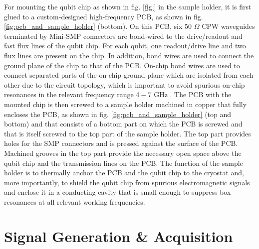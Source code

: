 For mounting the qubit chip as shown in fig. \ref{fig:} in the sample holder, it is first glued to a custom-designed high-frequency PCB, as shown in fig. \ref{fig:pcb_and_sample_holder} (bottom). On this PCB, six 50 $\Omega$ CPW waveguides terminated by Mini-SMP connectors are bond-wired to the drive/readout and fast flux lines of the qubit chip. For each qubit, one readout/drive line and two flux lines are present on the chip. In addition, bond wires are used to connect the ground plane of the chip to that of the PCB. On-chip bond wires are used to connect separated parts of the on-chip ground plane which are isolated from each other due to the circuit topology, which is important to avoid spurious on-chip resonances in the relevant frequency range $4-7$ GHz \citep{schuster_circuit_2007}. The PCB with the mounted chip is then screwed to a sample holder machined in copper that fully encloses the PCB, as shown in fig. \ref{fig:pcb_and_sample_holder} (top and bottom) and that consists of a bottom part on which the PCB is screwed and that is itself screwed to the top part of the sample holder. The top part provides holes for the SMP connectors and is pressed against the surface of the PCB. Machined grooves in the top part provide the necessary open space above the qubit chip and the transmission lines on the PCB. The function of the sample holder is to thermally anchor the PCB and the qubit chip to the cryostat and, more importantly, to shield the qubit chip from spurious electromagnetic signals and enclose it in a conducting cavity that is small enough to suppress box resonances at all relevant working frequencies.

\section{Signal Generation \& Acquisition}

